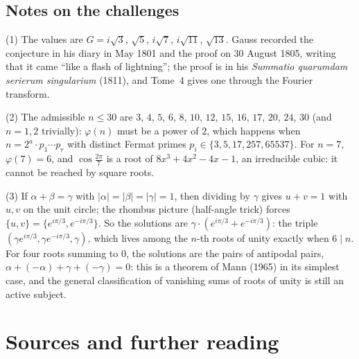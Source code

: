 \subsection*{Notes on the challenges}

(1) The values are $G=i\sqrt3$, $\sqrt5$, $i\sqrt7$, $i\sqrt{11}$, $\sqrt{13}$. Gauss recorded the conjecture in his diary in May 1801 and the proof on 30 August 1805, writing that it came ``like a flash of lightning''; the proof is in his \emph{Summatio quarumdam serierum singularium} (1811), and Tome~4 gives one through the Fourier transform.

(2) The admissible $n\le30$ are $3$, $4$, $5$, $6$, $8$, $10$, $12$, $15$, $16$, $17$, $20$, $24$, $30$ (and $n=1,2$ trivially): $\varphi(n)$ must be a power of $2$, which happens when $n=2^a\cdot p_1\cdots p_r$ with distinct Fermat primes $p_i\in\{3,5,17,257,65537\}$. For $n=7$, $\varphi(7)=6$, and $\cos\frac{2\pi}7$ is a root of $8x^3+4x^2-4x-1$, an irreducible cubic: it cannot be reached by square roots.

(3) If $\alpha+\beta=\gamma$ with $|\alpha|=|\beta|=|\gamma|=1$, then dividing by $\gamma$ gives $u+v=1$ with $u,v$ on the unit circle; the rhombus picture (half-angle trick) forces $\{u,v\}=\{e^{i\pi/3},e^{-i\pi/3}\}$. So the solutions are $\gamma\cdot(e^{i\pi/3}+e^{-i\pi/3})$: the triple $(\gamma e^{i\pi/3},\gamma e^{-i\pi/3},\gamma)$, which lives among the $n$-th roots of unity exactly when $6\mid n$. For four roots summing to $0$, the solutions are the pairs of antipodal pairs, $\alpha+(-\alpha)+\gamma+(-\gamma)=0$: this is a theorem of Mann (1965) in its simplest case, and the general classification of vanishing sums of roots of unity is still an active subject.

\section*{Sources and further reading}

